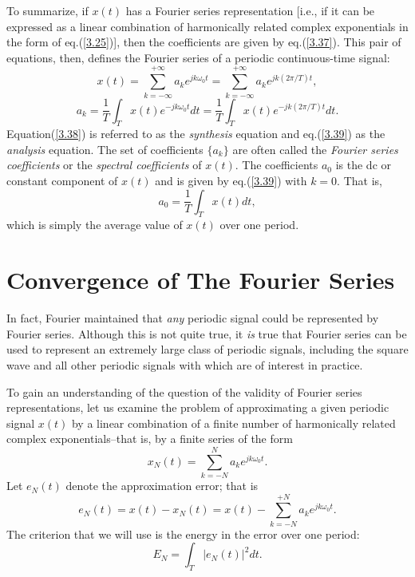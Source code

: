 \documentclass[a4paper,10pt,twoside]{book}
\begin{document}
To summarize, if $x(t)$ has a Fourier series representation [i.e., if it can be expressed as a linear combination of harmonically related complex exponentials in the form of eq.\;(\ref{3.25})], then the coefficients are given by eq.\;(\ref{3.37}). This pair of equations, then, defines the Fourier series of a periodic continuous-time signal:
\begin{equation}
    x(t) = \sum_{k=-\infty}^{+\infty}a_{k}e^{jk\omega_{0}t} = \sum_{k=-\infty}^{+\infty}a_{k}e^{jk(2\pi/T)t},
    \label{3.38}
\end{equation}
\begin{equation}
    a_{k}=\frac{1}{T}\int_{T}x(t)e^{-jk\omega_{0}t} dt = \frac{1}{T}\int_{T}x(t)e^{-jk(2\pi/T)t} dt.
    \label{3.39}
\end{equation}
Equation\;(\ref{3.38}) is referred to as the \textit{synthesis} equation and eq.\;(\ref{3.39}) as the \textit{analysis} equation. The set of coefficients $\{a_k\}$ are often called the \textit{Fourier series coefficients} or the \textit{spectral coefficients} of $x(t)$. The coefficients $a_0$ is the dc or constant component of $x(t)$ and is given by eq.\;(\ref{3.39}) with $k=0$. That is,
\begin{equation}
    a_0=\dfrac1T\int_Tx(t)dt,
    \label{3.40}
\end{equation}
which is simply the average value of $x(t)$ over one period.

\section{Convergence of The Fourier Series}
\label{section:3.4}

In fact, Fourier maintained that \textit{any} periodic signal could be represented by Fourier series. Although this is not quite true, it \textit{is} true that Fourier series can be used to represent an extremely large class of periodic signals, including the square wave and all other periodic signals with which are of interest in practice.

To gain an understanding of the question of the validity of Fourier series representations, let us examine the problem of approximating a given periodic signal $x(t)$ by a linear combination of a finite number of harmonically related complex exponentials--that is, by a finite series of the form
\begin{equation}
    x_N(t)=\sum_{k=-N}^Na_ke^{jk\omega_0t}.
    \label{3.47}
\end{equation}
Let $e_N(t)$ denote the approximation error; that is
\begin{equation}
    e_N(t)=x(t)-x_N(t)=x(t)-\sum_{k=-N}^{+N}a_ke^{jk\omega_0t}.
    \label{3.48}
\end{equation}
The criterion that we will use is the energy in the error over one period:
\begin{equation}
    E_N = \int_T|e_N(t)|^2 dt.
    \label{3.49}
\end{equation}
\end{document}
